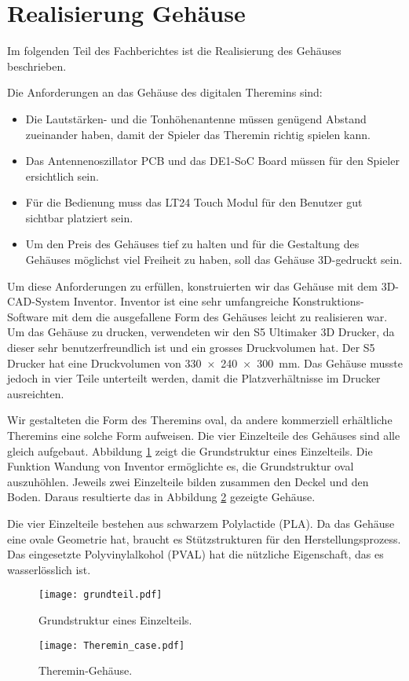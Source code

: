 \clearpage
\section{Realisierung Gehäuse}\label{sec:Realisierung Gehäuse}
Im folgenden Teil des Fachberichtes ist die Realisierung des Gehäuses beschrieben. 

Die Anforderungen an das Gehäuse des digitalen Theremins sind:
\begin{itemize}
	\item Die Lautstärken- und die Tonhöhenantenne müssen genügend Abstand zueinander haben, damit der Spieler das Theremin richtig spielen kann.
	\item Das Antennenoszillator PCB und das DE1-SoC Board müssen für den Spieler ersichtlich sein.
	\item Für die Bedienung muss das LT24 Touch Modul für den Benutzer gut sichtbar platziert sein.
	\item Um den Preis des Gehäuses tief zu halten und für die Gestaltung des Gehäuses möglichst viel Freiheit zu haben, soll das Gehäuse 3D-gedruckt sein.  
\end{itemize}

Um diese Anforderungen zu erfüllen, konstruierten wir das Gehäuse mit dem 3D-CAD-System Inventor. Inventor ist eine sehr umfangreiche Konstruktions-Software mit dem die ausgefallene Form des Gehäuses leicht zu realisieren war.
Um das Gehäuse zu drucken, verwendeten wir den S5 Ultimaker 3D Drucker, da dieser sehr benutzerfreundlich ist und ein grosses Druckvolumen hat. 
Der S5 Drucker hat eine Druckvolumen von \SI{330x240x300}{mm}. 
Das Gehäuse musste jedoch in vier Teile unterteilt werden, damit die Platzverhältnisse im Drucker ausreichten. 

Wir gestalteten die Form des Theremins oval, da andere kommerziell erhältliche Theremins eine solche Form aufweisen. Die vier Einzelteile des Gehäuses sind alle gleich aufgebaut. Abbildung \ref{img:grundteil} zeigt die Grundstruktur eines Einzelteils. Die Funktion Wandung von Inventor ermöglichte es, die Grundstruktur oval auszuhöhlen. Jeweils zwei Einzelteile bilden zusammen den Deckel und den Boden. Daraus resultierte das in Abbildung \ref{img:Theremin_case} gezeigte Gehäuse. 

Die vier Einzelteile bestehen aus schwarzem Polylactide (PLA). Da das Gehäuse eine ovale Geometrie hat, braucht es Stützstrukturen für den Herstellungsprozess. Das eingesetzte Polyvinylalkohol (PVAL) hat die nützliche Eigenschaft, das es wasserlösslich ist.
\begin{figure}[h]
	\centering
	\texttt{[image: grundteil.pdf]}
	\caption{Grundstruktur eines Einzelteils.}
	\label{img:grundteil}
\end{figure}
\begin{figure}[h]
	\centering
	\texttt{[image: Theremin\_case.pdf]}
	\caption{Theremin-Gehäuse.}
	\label{img:Theremin_case}
\end{figure}




